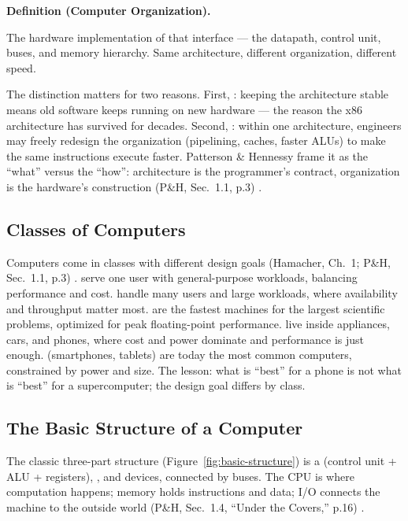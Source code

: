 \documentclass[11pt]{article}
\newenvironment{definitionbox}[1]{%
  \par\noindent\textbf{Definition (#1).}\ \itshape
}{\par\vspace{0.3em}}
\begin{document}
\begin{definitionbox}{Computer Organization}
The hardware implementation of that interface --- the datapath, control unit, buses, and memory hierarchy. Same architecture, different organization, different speed.
\end{definitionbox}

The distinction matters for two reasons. First, : keeping the architecture stable means old software keeps running on new hardware --- the reason the x86 architecture has survived for decades. Second, : within one architecture, engineers may freely redesign the organization (pipelining, caches, faster ALUs) to make the same instructions execute faster. Patterson \& Hennessy frame it as the ``what'' versus the ``how'': architecture is the programmer's contract, organization is the hardware's construction (P\&H, Sec.~1.1, p.3) \cite{PattersonHennessy2017_computer_organization_design}.

\subsection{Classes of Computers}

Computers come in classes with different design goals (Hamacher, Ch.~1; P\&H, Sec.~1.1, p.3) \cite{Hamacher2002_computer_organization,PattersonHennessy2017_computer_organization_design}.  serve one user with general-purpose workloads, balancing performance and cost.  handle many users and large workloads, where availability and throughput matter most.  are the fastest machines for the largest scientific problems, optimized for peak floating-point performance.  live inside appliances, cars, and phones, where cost and power dominate and performance is just enough.  (smartphones, tablets) are today the most common computers, constrained by power and size. The lesson: what is ``best'' for a phone is not what is ``best'' for a supercomputer; the design goal differs by class.

\subsection{The Basic Structure of a Computer}

The classic three-part structure (Figure~\ref{fig:basic-structure}) is a  (control unit + ALU + registers), , and  devices, connected by buses. The CPU is where computation happens; memory holds instructions and data; I/O connects the machine to the outside world (P\&H, Sec.~1.4, ``Under the Covers,'' p.16) \cite{PattersonHennessy2017_computer_organization_design}.
\end{document}
